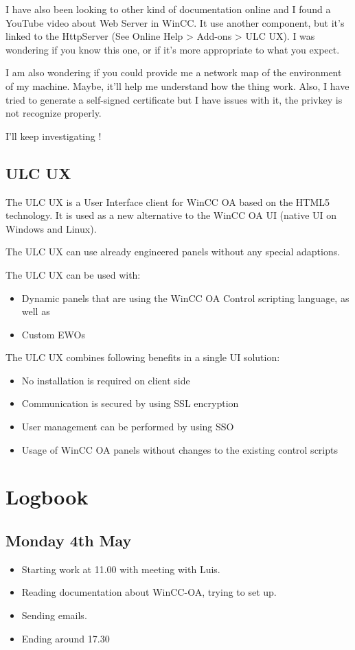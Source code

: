 \documentclass[a4paper, 10pt]{article}
\begin{document}
I have also been looking to other kind of documentation online and I found a YouTube video about Web Server in WinCC. 
It use another component, but it's linked to the HttpServer (See Online Help > Add-ons > ULC UX).
I was wondering if you know this one, or if it's more appropriate to what you expect.

I am also wondering if you could provide me a network map of the environment of my machine. Maybe, it'll help me understand how the thing work.
Also, I have tried to generate a self-signed certificate but I have issues with it, the privkey is not recognize properly.

I'll keep investigating !

\subsection{ULC UX}
The ULC UX is a User Interface client for WinCC OA based on the HTML5 technology. It is used as a new alternative to the WinCC OA UI (native UI on Windows and Linux).

The ULC UX can use already engineered panels without any special adaptions.

The ULC UX can be used with:
\begin{itemize}
    \item Dynamic panels that are using the WinCC OA Control scripting language, as well as
    \item Custom EWOs
\end{itemize}

The ULC UX combines following benefits in a single UI solution:
\begin{itemize}
    \item No installation is required on client side
    \item Communication is secured by using SSL encryption
    \item User management can be performed by using SSO
    \item Usage of WinCC OA panels without changes to the existing control scripts
\end{itemize}

\newpage
\footnotesize
\section{Logbook}
\subsection*{Monday 4th May}
\begin{itemize}
    \item Starting work at 11.00 with meeting with Luis.
    \item Reading documentation about WinCC-OA, trying to set up.
    \item Sending emails.
    \item Ending around 17.30
\end{itemize}
\end{document}
